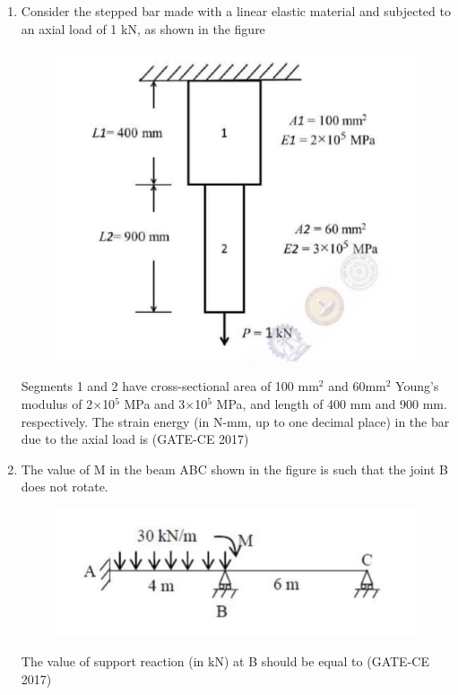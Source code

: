 \documentclass[journal,12pt,onecolumn]{article}
\theoremstyle{remark}
\begin{document}
\begin{enumerate}
    \item Consider the stepped bar made with a linear elastic material and subjected to an axial load of 1 kN, as shown in the figure 
    \begin{figure}[H]
    \centering
    \includegraphics[width=0.7\columnwidth]{figs/imageq39.jpg}  
    \caption{}
    \label{fig:39}
    \end{figure}
    Segments 1 and 2 have cross-sectional area of 100 mm$^2$ and 60mm$^2$ Young's modulus of 2$\times$10$^5$ MPa and 3$\times$10$^5$ MPa, and length of 400 mm and 900 mm. respectively. The strain energy (in N-mm, up to one decimal place) in the bar due to the axial load is \underline{\hspace{3cm}}\hfill (GATE-CE 2017)

    \item The value of M in the beam ABC shown in the figure  is such that the joint B does not rotate.
    \begin{figure}[H]
    \centering
    \includegraphics[width=0.7\columnwidth]{figs/imageq40.jpg}  
    \caption{}
    \label{fig:40}
    \end{figure}
    The value of support reaction (in kN) at B should be equal to \underline{\hspace{3cm}}\hfill (GATE-CE 2017)


\end{enumerate}
\end{document}
